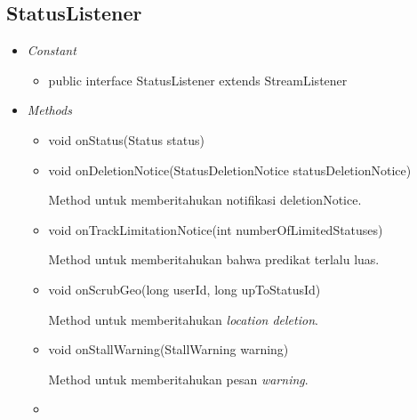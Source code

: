 	\subsection{StatusListener}
	\begin{itemize}
		\item \textit{Constant}
		
		\begin{itemize}
			\item public interface StatusListener
			extends StreamListener
		\end{itemize}
		\item \textit{Methods}
		
		\begin{itemize}
			\item void onStatus(Status status)
			\item void onDeletionNotice(StatusDeletionNotice statusDeletionNotice)
			
			Method untuk memberitahukan notifikasi deletionNotice.
			\item void onTrackLimitationNotice(int numberOfLimitedStatuses)
			
			Method untuk memberitahukan bahwa predikat terlalu luas.
			\item void onScrubGeo(long userId, long upToStatusId)
			
			Method untuk memberitahukan \textit{location deletion}.
			\item void onStallWarning(StallWarning warning)
			
			Method untuk memberitahukan pesan \textit{warning}.
			\item 
		\end{itemize}
	\end{itemize}
	
